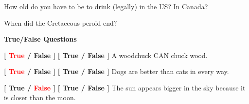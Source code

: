\documentclass[10pt,addpoints]{exam}
\begin{document}
\begin{questions}
\par\vspace{0.100000in}\begin{minipage}{\linewidth}
\vspace{.35cm}\question[2]
How old do you have to be to drink (legally) in the US?  In Canada?
\vspace{.25cm}\setlength\answerlinelength{3in}
\answerline[21]
\answerline[18]
\end{minipage}


\par\vspace{0.100000in}\begin{minipage}{\linewidth}
\vspace{.35cm}\question[2]
When did the Cretaceous peroid end?
\vspace{.25cm}\setlength\answerlinelength{3in}
\end{minipage}





\newpage
\begin{center}
{\Large \textbf{True/False Questions}}
\end{center}

\par\vspace{0.100000in}\begin{minipage}{\linewidth}
\question[1]
\ifprintanswers
\textbf{[ \textcolor{red}{True} / False ]} \else
\textbf{[ True / False ]} \fi
A woodchuck CAN chuck wood.
\medskip
\end{minipage}


\par\vspace{0.100000in}\begin{minipage}{\linewidth}
\question[1]
\ifprintanswers
\textbf{[ \textcolor{red}{True} / False ]} \else
\textbf{[ True / False ]} \fi
Dogs are better than cats in every way.
\medskip
\end{minipage}


\par\vspace{0.100000in}\begin{minipage}{\linewidth}
\question[1]
\ifprintanswers
\textbf{[ True / \textcolor{red}{False} ]} \else
\textbf{[ True / False ]} \fi
The sun appears bigger in the sky because it is closer than the moon.
\medskip
\end{minipage}



\end{questions}
\end{document}
